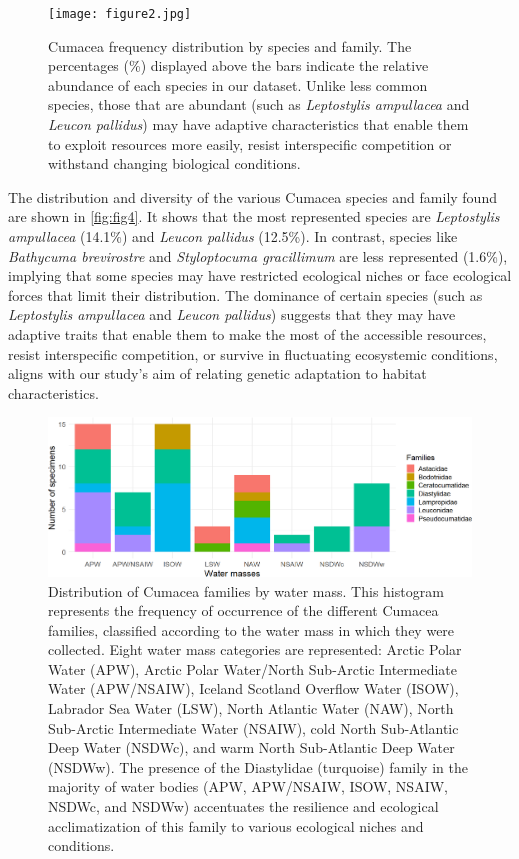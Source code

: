 \begin{figure}[htbp]
    \centering
    \texttt{[image: figure2.jpg]}
    \caption{Cumacea frequency distribution by species and family. The percentages (\%) displayed above the bars indicate the relative abundance of each species in our dataset. Unlike less common species, those that are abundant (such as \emph{Leptostylis ampullacea} and \emph{Leucon pallidus}) may have adaptive characteristics that enable them to exploit resources more easily, resist interspecific competition or withstand changing biological conditions. \label{fig:fig4}}
\end{figure}

The distribution and diversity of the various Cumacea species and family found are shown in \autoref{fig:fig4}. It shows that the most represented species are \emph{Leptostylis ampullacea} (14.1\%) and \emph{Leucon pallidus} (12.5\%). In contrast, species like \emph{Bathycuma brevirostre} and \emph{Styloptocuma gracillimum} are less represented (1.6\%), implying that some species may have restricted ecological niches or face ecological forces that limit their distribution. The dominance of certain species (such as \emph{Leptostylis ampullacea} and \emph{Leucon pallidus}) suggests that they may have adaptive traits that enable them to make the most of the accessible resources, resist interspecific competition, or survive in fluctuating ecosystemic conditions, aligns with our study’s aim of relating genetic adaptation to habitat characteristics.

\begin{figure}[htbp]
    \centering
    \includegraphics[width=\textwidth]{figure3.png}
    \caption{Distribution of Cumacea families by water mass. This histogram represents the frequency of occurrence of the different Cumacea families, classified according to the water mass in which they were collected. Eight water mass categories are represented: Arctic Polar Water (APW), Arctic Polar Water/North Sub-Arctic Intermediate Water (APW/NSAIW), Iceland Scotland Overflow Water (ISOW), Labrador Sea Water (LSW), North Atlantic Water (NAW), North Sub-Arctic Intermediate Water (NSAIW), cold North Sub-Atlantic Deep Water (NSDWc), and warm North Sub-Atlantic Deep Water (NSDWw). The presence of the Diastylidae (turquoise) family in the majority of water bodies (APW, APW/NSAIW, ISOW, NSAIW, NSDWc, and NSDWw) accentuates the resilience and ecological acclimatization of this family to various ecological niches and conditions. \label{fig:fig5}}
\end{figure}

